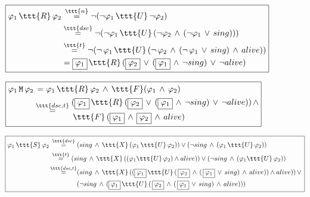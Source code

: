 \documentclass[11pt]{article}
\begin{document}
$\boxed{\begin{aligned}
            \varphi_1\,\ttt{R}\,\varphi_2 &\,\overset{\ttt{n}}{=} \neg(\neg\varphi_1\,\ttt{U}\,\neg\varphi_2) \\
            &\overset{\ttt{dsc}}{=} \neg(\neg\varphi_1\,\ttt{U}\,(\neg\varphi_2\,\land\,(\neg\varphi_1\,\lor\,sing)))\\
            &\overset{\ttt{t}}{=} \neg(\neg\,\varphi_1\,\ttt{U}\,(\neg\,\varphi_2\,\land\,(\neg\,\varphi_1\,\lor\,sing)\,\land\,alive))\\
            &= \boxed{\varphi_1}\,\ttt{R}\,(\boxed{\varphi_2}\,\lor\,(\boxed{\varphi_1}\,\land\,\neg sing)\,\lor\,\neg alive)
\end{aligned}}$

\vspace{0.25cm}

$\boxed{\begin{aligned}
      \varphi_1\,\tt{M}\,\varphi_2 &\,= \varphi_1\,\ttt{R}\,\varphi_2\,\land\,\ttt{F}(\varphi_1\,\land\,\varphi_2) \\
      &\overset{\ttt{dsc,t}}{=} \begin{aligned}
                                     &(\boxed{\varphi_1}\,\ttt{R}\,(\boxed{\varphi_2}\,\lor\,(\boxed{\varphi_1}\,\land\,\neg sing)\,\lor\,\neg alive))\,\land\\
                                     &\,\ttt{F}\,(\boxed{\varphi_1}\,\land\,\boxed{\varphi_2}\,\land\,alive)
      \end{aligned}
\end{aligned}}$

\vspace{0.25cm}

$\boxed{\begin{aligned}
      \varphi_1\,\ttt{S}\,\varphi_2 \,&\overset{\ttt{dsc}}{=} (sing\,\land\,\ttt{X}\,(\varphi_1\,\ttt{U}\,\varphi_2)) \lor (\neg sing\,\land\,(\varphi_1\,\ttt{U}\,\varphi_2))\\
      &\overset{\ttt{t}}{=} (sing\,\land\,\ttt{X}\,((\varphi_1\ttt{U}\,\varphi_2) \land alive)) \lor (\neg sing\,\land\,(\varphi_1\ttt{U}\,\varphi_2))\\
      &\begin{aligned}\overset{\ttt{dsc,t}}{=}&(sing\,\land\,\ttt{X}\,((\boxed{\varphi_1}\,\ttt{U}\,(\,\boxed{\varphi_2}\,\land\,(\,\boxed{\varphi_1}\,\lor\,sing)\,\land\,alive)) \land alive))\,\lor\, \\
      &(\neg sing\,\land\,(\boxed{\varphi_1}\,\ttt{U}\,(\,\boxed{\varphi_2}\,\land\,(\,\boxed{\varphi_1}\,\lor\,sing)\,\land\,alive)))\end{aligned}
\end{aligned}}$
\end{document}

